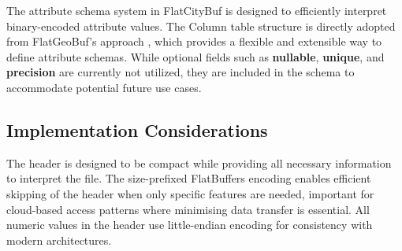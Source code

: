 The attribute schema system in FlatCityBuf is designed to efficiently interpret binary-encoded attribute values. The Column table structure is directly adopted from FlatGeoBuf's approach \citep{horance_2022_detail}, which provides a flexible and extensible way to define attribute schemas. While optional fields such as \textbf{nullable}, \textbf{unique}, and \textbf{precision} are currently not utilized, they are included in the schema to accommodate potential future use cases.

\subsection{Implementation Considerations}
\label{methodology:header:implementation_considerations}

The header is designed to be compact while providing all necessary information to interpret the file. The size-prefixed FlatBuffers encoding enables efficient skipping of the header when only specific features are needed, important for cloud-based access patterns where minimising data transfer is essential. All numeric values in the header use little-endian encoding for consistency with modern architectures.
